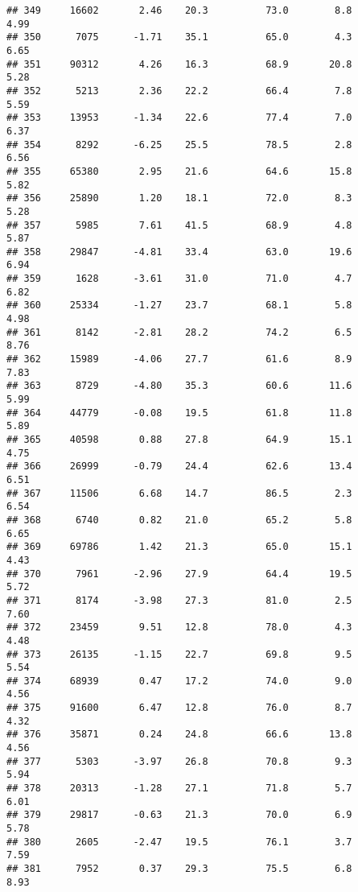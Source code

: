 \documentclass[
]{article}
\begin{document}
\begin{verbatim}
## 349     16602       2.46    20.3          73.0        8.8              4.99
## 350      7075      -1.71    35.1          65.0        4.3              6.65
## 351     90312       4.26    16.3          68.9       20.8              5.28
## 352      5213       2.36    22.2          66.4        7.8              5.59
## 353     13953      -1.34    22.6          77.4        7.0              6.37
## 354      8292      -6.25    25.5          78.5        2.8              6.56
## 355     65380       2.95    21.6          64.6       15.8              5.82
## 356     25890       1.20    18.1          72.0        8.3              5.28
## 357      5985       7.61    41.5          68.9        4.8              5.87
## 358     29847      -4.81    33.4          63.0       19.6              6.94
## 359      1628      -3.61    31.0          71.0        4.7              6.82
## 360     25334      -1.27    23.7          68.1        5.8              4.98
## 361      8142      -2.81    28.2          74.2        6.5              8.76
## 362     15989      -4.06    27.7          61.6        8.9              7.83
## 363      8729      -4.80    35.3          60.6       11.6              5.99
## 364     44779      -0.08    19.5          61.8       11.8              5.89
## 365     40598       0.88    27.8          64.9       15.1              4.75
## 366     26999      -0.79    24.4          62.6       13.4              6.51
## 367     11506       6.68    14.7          86.5        2.3              6.54
## 368      6740       0.82    21.0          65.2        5.8              6.65
## 369     69786       1.42    21.3          65.0       15.1              4.43
## 370      7961      -2.96    27.9          64.4       19.5              5.72
## 371      8174      -3.98    27.3          81.0        2.5              7.60
## 372     23459       9.51    12.8          78.0        4.3              4.48
## 373     26135      -1.15    22.7          69.8        9.5              5.54
## 374     68939       0.47    17.2          74.0        9.0              4.56
## 375     91600       6.47    12.8          76.0        8.7              4.32
## 376     35871       0.24    24.8          66.6       13.8              4.56
## 377      5303      -3.97    26.8          70.8        9.3              5.94
## 378     20313      -1.28    27.1          71.8        5.7              6.01
## 379     29817      -0.63    21.3          70.0        6.9              5.78
## 380      2605      -2.47    19.5          76.1        3.7              7.59
## 381      7952       0.37    29.3          75.5        6.8              8.93

\end{verbatim}
\end{document}

